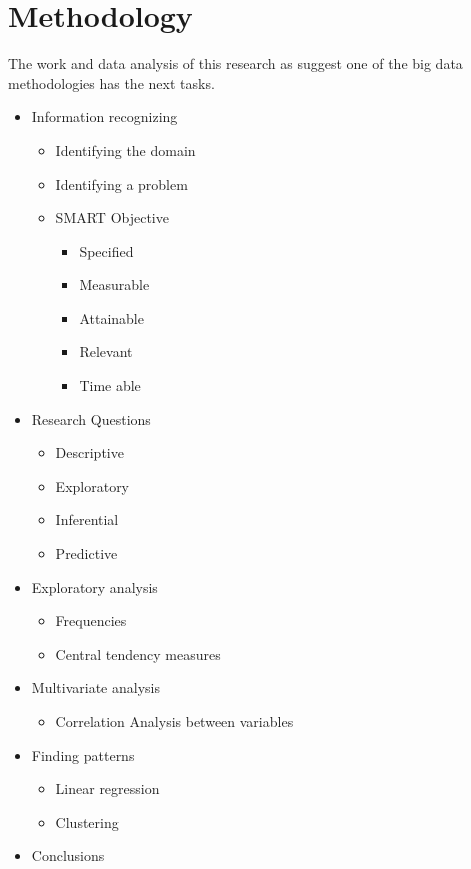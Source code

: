 \section{Methodology}
 The work and data analysis of this research as suggest one of the big data methodologies has the next tasks.
 \begin{itemize}
  \item Information recognizing 
  \begin{itemize}
   \item Identifying the domain
   \item Identifying a problem
   \item SMART Objective 
    \begin{itemize}
     \item Specified
     \item Measurable
     \item Attainable
     \item Relevant
     \item Time able               
    \end{itemize}
  \end{itemize}
  \item Research Questions
  \begin{itemize}
   \item Descriptive
   \item Exploratory
   \item Inferential
   \item Predictive
  \end{itemize}
  \item Exploratory analysis
  \begin{itemize}
   \item Frequencies
   \item Central tendency measures
  \end{itemize}
  \item Multivariate analysis
  \begin{itemize}
	\item Correlation Analysis between variables
  \end{itemize}
  \item Finding patterns
   \begin{itemize}
    \item Linear regression
    \item Clustering
   \end{itemize}  
  \item Conclusions
 \end{itemize}
